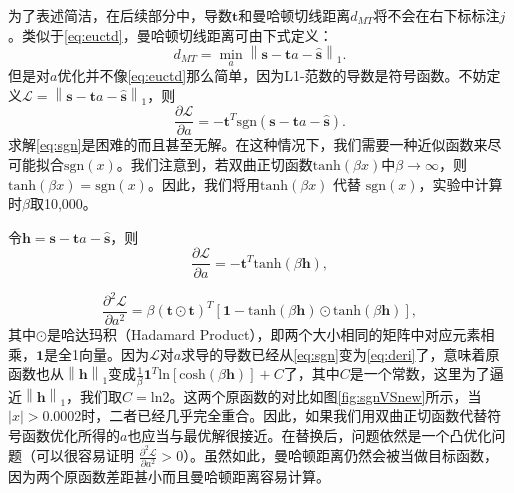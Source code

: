 为了表述简洁，在后续部分中，导数$\mathbf{t}$和曼哈顿切线距离$d_{MT}$将不会在右下标标注$j$。类似于\eqref{eq:euctd}，曼哈顿切线距离可由下式定义：
\begin{equation}
d_{MT} = \mathop {\min }\limits_{a} {\left\| \mathbf{s} - \mathbf{t}a - \widehat{\mathbf{s}} \right\|}_1. \label{eq:mantd}
\end{equation}
但是对$a$优化并不像\eqref{eq:euctd}那么简单，因为L1-范数的导数是符号函数。不妨定义$\mathcal{L} = {\left\| \mathbf{s} - \mathbf{t}a - \widehat{\mathbf{s}} \right\|}_1$，则
\begin{equation}
\frac{\partial \mathcal{L}}{\partial a} = -\mathbf{t}^T \mathrm{sgn}\left( \mathbf{s} - \mathbf{t}a - \widehat{\mathbf{s}} \right). \label{eq:sgn}
\end{equation}
求解\eqref{eq:sgn}是困难的而且甚至无解。在这种情况下，我们需要一种近似函数来尽可能拟合$\mathrm{sgn}(x)$。我们注意到，若双曲正切函数$\mathrm{tanh}(\beta x)$中$\beta \rightarrow \infty$，则$\mathrm{tanh}(\beta x) = \mathrm{sgn}(x)$。因此，我们将用$\mathrm{tanh}(\beta x)$ 代替 $\mathrm{sgn}(x)$，实验中计算时$\beta$取10,000。

令$\mathbf{h} = \mathbf{s} - \mathbf{t}a - \widehat{\mathbf{s}}$，则
\begin{equation}
\frac{\partial \mathcal{L}}{\partial a} = -\mathbf{t}^T \mathrm{tanh}\left( \beta \mathbf{h} \right), 
\label{eq:deri}
\end{equation}

\begin{equation}
\frac{{\partial}^2 \mathcal{L}}{\partial a^2} = \beta \left( \mathbf{t} \odot \mathbf{t} \right )^T \left[ \mathbf{1} - \mathrm{tanh}\left( \beta \mathbf{h} \right) \odot \mathrm{tanh}\left( \beta \mathbf{h} \right) \right], 
\label{eq:hessian}
\end{equation}
其中$\odot$是哈达玛积（Hadamard Product），即两个大小相同的矩阵中对应元素相乘，$\mathbf{1}$是全1向量。因为$\mathcal{L}$对$a$求导的导数已经从\eqref{eq:sgn}变为\eqref{eq:deri}了，意味着原函数也从${\left\| \mathbf{h} \right\|}_1$变成$\frac{1}{\beta}\mathbf{1}^T\mathrm{ln}\left[ \mathrm{cosh} \left( \beta \mathbf{h} \right) \right] + C$了，其中$C$是一个常数，这里为了逼近${\left\| \mathbf{h} \right\|}_1$，我们取$C=\mathrm{ln}2$。这两个原函数的对比如图\ref{fig:sgnVSnew}所示，当$|x|>0.0002$时，二者已经几乎完全重合。因此，如果我们用双曲正切函数代替符号函数优化所得的$a$也应当与最优解很接近。在替换后，问题依然是一个凸优化问题（可以很容易证明 $\frac{{\partial}^2 \mathcal{L}}{\partial a^2} > 0$）。虽然如此，曼哈顿距离仍然会被当做目标函数，因为两个原函数差距甚小而且曼哈顿距离容易计算。

